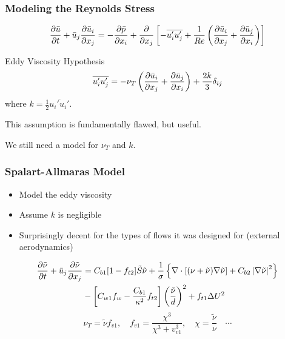 \documentclass{beamer}
\def\nut{\tilde\nu}
\begin{document}
\begin{frame}\frametitle{Modeling the Reynolds Stress}
\begin{equation*}
\pd{\bar u}{t}+\bar u_j\pd{\bar u_i}{x_j}=-\pd{\bar p}{x_i}
+\pd{}{x_j}\left[-\overline{u_i'u_j'}
+\frac{1}{Re}\left(\pd{\bar u_i}{x_j}+\pd{\bar u_j}{x_i}\right)\right]
\end{equation*}
\begin{block}{Eddy Viscosity Hypothesis}
\begin{equation*}
\overline{u_i'u_j'}=-\nu_T\left(\pd{\bar u_i}{x_j}+\pd{\bar u_j}{x_i}\right)
+\frac{2k}{3}\delta_{ij}
\end{equation*}
where $k=\frac{1}{2}\overline{u_i'u_i'}$.
\end{block}
This assumption is fundamentally flawed, but useful.

\vspace{2ex}
We still need a model for $\nu_T$ and $k$.
\end{frame}

\begin{frame}\frametitle{Spalart-Allmaras Model}
\begin{itemize}
	\item Model the eddy viscosity
	\item Assume $k$ is negligible
	\item Surprisingly decent for the types of flows it was designed for (external aerodynamics)
\end{itemize}
\begin{align*}
\pd{\nut}{t}+\bar u_j\pd{\nut}{x_j}&=C_{b1}[1-f_{t2}]\tilde S\nut+\frac{1}{\sigma}
\left\{\Div[(\nu+\nut)\Grad\nut]+C_{b2}\snorm{\Grad\nut}^2\right\}\\
&-\left[C_{w1}f_{w}-\frac{C_{b1}}{\kappa^2}f_{t2}\right]\left(\frac{\nut}{d}\right)^2+f_{t1}\Delta U^2
\end{align*}
\begin{equation*}
\nu_T=\nut f_{v1},\quad f_{v1}=\frac{\chi^3}{\chi^3+v_{v1}^3},
\quad \chi=\frac{\nut}{\nu}\quad\cdots
\end{equation*}
\end{frame}
\end{document}
